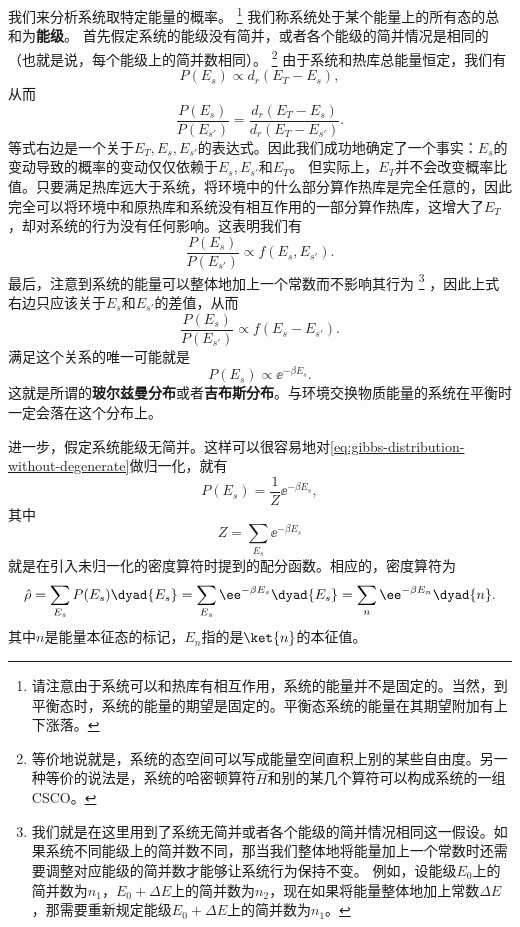 我们来分析系统取特定能量的概率。%
\footnote{请注意由于系统可以和热库有相互作用，系统的能量并不是固定的。当然，到平衡态时，系统的能量的期望是固定的。平衡态系统的能量在其期望附加有上下涨落。}%
我们称系统处于某个能量上的所有态的总和为\textbf{能级}。
首先假定系统的能级没有简并，或者各个能级的简并情况是相同的（也就是说，每个能级上的简并数相同）。%
\footnote{等价地说就是，系统的态空间可以写成能量空间直积上别的某些自由度。另一种等价的说法是，系统的哈密顿算符$\hat{H}$和别的某几个算符可以构成系统的一组CSCO。}%
由于系统和热库总能量恒定，我们有
\[
    P(E_s) \propto d_r (E_T - E_s),
\]
从而
\[
    \frac{P(E_s)}{P(E_{s'})} = \frac{d_r (E_T - E_s)}{d_r (E_T - E_{s'})}.
\]
等式右边是一个关于$E_T, E_s, E_{s'}$的表达式。因此我们成功地确定了一个事实：$E_s$的变动导致的概率的变动仅仅依赖于$E_s, E_{s'}$和$E_T$。
但实际上，$E_T$并不会改变概率比值。只要满足热库远大于系统，将环境中的什么部分算作热库是完全任意的，因此完全可以将环境中和原热库和系统没有相互作用的一部分算作热库，这增大了$E_T$，却对系统的行为没有任何影响。这表明我们有
\[
    \frac{P(E_s)}{P(E_{s'})} \propto f(E_s, E_{s'}).
\]
最后，注意到系统的能量可以整体地加上一个常数而不影响其行为%
\footnote{我们就是在这里用到了系统无简并或者各个能级的简并情况相同这一假设。如果系统不同能级上的简并数不同，那当我们整体地将能量加上一个常数时还需要调整对应能级的简并数才能够让系统行为保持不变。
例如，设能级$E_0$上的简并数为$n_1$，$E_0 + \Delta E$上的简并数为$n_2$，现在如果将能量整体地加上常数$\Delta E$，那需要重新规定能级$E_0 + \Delta E$上的简并数为$n_1$。}%
，因此上式右边只应该关于$E_s$和$E_{s'}$的差值，从而
\[
    \frac{P(E_s)}{P(E_{s'})} \propto f(E_s - E_{s'}).
\]
满足这个关系的唯一可能就是
\begin{equation}
    P(E_s) \propto \ee^{- \beta E_s}.
    \label{eq:gibbs-distribution-without-degenerate}
\end{equation}
这就是所谓的\textbf{玻尔兹曼分布}或者\textbf{吉布斯分布}。与环境交换物质能量的系统在平衡时一定会落在这个分布上。


进一步，假定系统能级无简并。这样可以很容易地对\eqref{eq:gibbs-distribution-without-degenerate}做归一化，就有
\begin{equation}
    P(E_s) = \frac{1}{Z} \ee^{ - \beta E_s},
    \label{eq:distribution-of-energy-without-degenerate}
\end{equation}
其中
\begin{equation}
    Z = \sum_{E_s} \ee^{ - \beta E_s}
    \label{eq:partition-function-without-degenerate}
\end{equation}
就是在引入未归一化的密度算符时提到的配分函数。相应的，密度算符为
\begin{equation}
    \hat{\rho} = \sum_{E_s} P(E_s) \dyad{E_s} = \sum_{E_s} \ee^{-\beta E_s} \dyad{E_s} = \sum_n \ee^{-\beta E_n} \dyad{n}.
    \label{eq:density-operator-without-degenerate}
\end{equation}
其中$n$是能量本征态的标记，$E_n$指的是$\ket{n}$的本征值。

